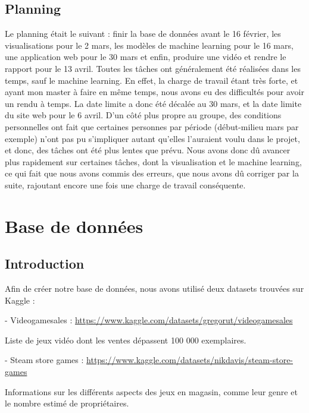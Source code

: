 \documentclass[mstat,12pt]{unswthesis}
\begin{document}
\hypertarget{planning}{%
\section{\textbf{Planning}}\label{Planning}}

Le planning était le suivant : finir la base de données avant le 16 février, les visualisations pour le 2 mars, les modèles de machine learning pour le 16 mars, une application web pour le 30 mars et enfin, produire une vidéo et rendre le rapport pour le 13 avril. Toutes les tâches ont généralement été réalisées dans les temps, sauf le machine learning. En effet, la charge de travail étant très forte, et ayant mon master à faire en même temps, nous avons eu des difficultés pour avoir un rendu à temps. La date limite a donc été décalée au 30 mars, et la date limite du site web pour le 6 avril. D’un côté plus propre au groupe, des conditions personnelles ont fait que certaines personnes par période (début-milieu mars par exemple) n’ont pas pu s’impliquer autant qu’elles l’auraient voulu dans le projet, et donc, des tâches ont été plus lentes que prévu. Nous avons donc dû avancer plus rapidement sur certaines tâches, dont la visualisation et le machine learning, ce qui fait que nous avons commis des erreurs, que nous avons dû corriger par la suite, rajoutant encore une fois une charge de travail conséquente.



\hypertarget{BD}{%
\chapter{\textbf{Base de données}}\label{chapBD}}


\hypertarget{IntroductionBD}{%
\section{\textbf{Introduction}}\label{IntroBD}}

Afin de créer notre base de données, nous avons utilisé deux datasets trouvées sur Kaggle :

- Videogamesales : \url{https://www.kaggle.com/datasets/gregorut/videogamesales}

Liste de jeux vidéo dont les ventes dépassent 100 000 exemplaires.

- Steam store games : \url{https://www.kaggle.com/datasets/nikdavis/steam-store-games}


Informations sur les différents aspects des jeux en magasin, comme leur genre et le nombre estimé de propriétaires. \\
\end{document}

